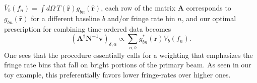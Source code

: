 \documentclass[twocolumn,apj,numberedappendix]{emulateapj}
\newcommand{\vis}{\mathbf{v}}
\newcommand{\A}{\mathbf{A}}
\newcommand{\N}{\mathbf{N}}
\newcommand{\rhat}{\hat{\mathbf{r}}}
\begin{document}
$\overline{V}_b (f_n)  = \int d\Omega  \,T (\hat{\mathbf{r}}) g_{bn} (\hat{\mathbf{r}})$, each row of the matrix $\mathbf{A}$ corresponds to $g_{bn} (\hat{\mathbf{r}})$ for a different baseline $b$ and/or fringe rate bin $n$, and our optimal prescription for combining time-ordered data becomes
\begin{equation}
\left( \A^\dagger \N^{-1} \vis \right)_{\delta,\alpha} \propto \sum_{n,b} g_{bn}^* (\hat{\mathbf{r}}) \overline{V}_b (f_n).
\end{equation}
One sees that the procedure essentially calls for a weighting that emphasizes the fringe rate bins that fall on bright portions of the primary beam. As seen in our toy example, this preferentially favors lower fringe-rates over higher ones.
%
%
%
\end{document}
